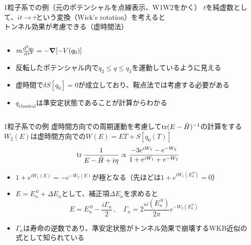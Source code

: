 \documentclass[14pt,aspectratio=169,xcolor=dvipsnames,table,dvipdfmx]{beamer}
\theoremstyle{definition}
\begin{document}
\begin{frame}{1粒子系での例（元のポテンシャルを点線表示、W1W2をかく）}
  $t$を純虚数として、$it\to\tau$という変換（Wick's rotation）を考えると\\
  トンネル効果が考慮できる（虚時間法）
  \begin{columns}[t]
    \begin{column}{.5\textwidth}
      \begin{itemize}
        \item $m\dv[2]{q_0}{\tau} = -\grad \qty[-V(q_0)]$
        \item 反転したポテンシャル内で$q_2\leq q\leq q_3$を運動しているように見える
        \item 虚時間で$\delta S[q_0]=0$が成立しており、鞍点法では考慮する必要がある
        \item $q_{\text{classical}}$は準安定状態であることが計算からわかる
      \end{itemize}
    \end{column}
    \begin{column}{.5\textwidth}
    \end{column}
  \end{columns}
\end{frame}

\begin{frame}{1粒子系での例}
  虚時間方向での周期運動を考慮して$\trace(E-\hat{H})^{-1}$の計算をする\\
  $W_2(E)$は虚時間方向での$W(E)=ET+S[q_0(T)]$
  \begin{equation*}
    \trace\frac{1}{E-\hat{H}+i\eta} \propto \frac{-3e^{iW_1}-e^{-W_2}}{1+e^{iW_1}+e^{-W_2}}
  \end{equation*}
  \begin{itemize}
    \item $1+e^{iW_1(E)}=-e^{-W_2(E)}$が極となる（先ほどは$1+e^{iW_1(E_n^{~0})}=0$）
    \item $E=E_{n}^{~0}+\varDelta E_n$として、補正項$\varDelta E_n$を求めると
          \begin{equation*}
            E = E_{n}^{~0} -\frac{i\Gamma_n}{2}\,,\quad \Gamma_n = 2\frac{\omega(E_n^{~0})}{2\pi}e^{-W_2(E_n^{~0})}
          \end{equation*}
    \item $\Gamma_n$は寿命の逆数であり、準安定状態がトンネル効果で崩壊するWKB近似の式として知られている
  \end{itemize}
\end{frame}
\end{document}

